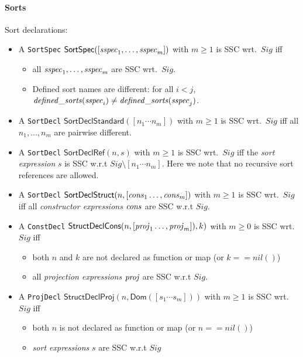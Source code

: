\documentclass[fleqn,a4paper,dvips]{article}
\newcommand{\aterm}[1]{\mathsf{#1}}
\begin{document}
\paragraph{Sorts}
Sort declarations:
\begin{itemize}
\item
  A {\tt SortSpec}
  $\aterm{SortSpec}([\nm{sspec}_1,\dots,\nm{sspec}_m])$ with $m\geq 1$
  is SSC wrt.\ $Sig$ iff
  \begin{itemize}
  \item all $\mathit{sspec}_1,\dots,\mathit{sspec}_m$ are SSC wrt.\ $Sig$.
  \item Defined sort names are different: for all $i<j$, $\mathit{defined\_sorts}(\mathit{sspec}_i)\neq\mathit{defined\_sorts}(\mathit{sspec}_j)$.
  \end{itemize}
\item
  A {\tt SortDecl}
  $\aterm{SortDeclStandard}([n_1\cdots n_m])$ with $m\geq 1$
  is SSC wrt.\ $Sig$ iff all $n_1,\ldots,n_m$ are pairwise
  different.
\item
  A {\tt SortDecl}
  $\aterm{SortDeclRef}(n,s)$ with $m\geq 1$
  is SSC wrt.\ $Sig$ iff the \emph{sort expression} $s$ is SSC w.r.t $Sig\setminus [n_1\cdots n_m]$.
  Here we note that no recursive sort references are allowed.
\item
  A {\tt SortDecl}
  $\aterm{SortDeclStruct}(n,[\nm{cons}_1\dots,\nm{cons}_m])$ with $m\geq 1$
  is SSC wrt.\ $Sig$ iff all \emph{constructor expressions} $\mathit{cons}$ are SSC w.r.t $Sig$.
\item
  A {\tt ConstDecl}
  $\aterm{StructDeclCons}(n,[\nm{proj}_1\dots,\nm{proj}_m]),k)$ with $m\geq 0$
  is SSC wrt.\ $Sig$ iff
  \begin{itemize}
  \item both $n$ and $k$ are not declared as function or map (or $k==nil()$)
  \item all \emph{projection expressions} $\mathit{proj}$ are SSC w.r.t $Sig$.
  \end{itemize}
\item
  A {\tt ProjDecl}
  $\aterm{StructDeclProj}(n,\aterm{Dom}([s_1\cdots s_m]))$ with $m\geq 1$
  is SSC wrt.\ $Sig$ iff
  \begin{itemize}
  \item both $n$ is not declared as function or map (or $n==nil()$)
  \item \emph{sort expressions} $s$ are SSC w.r.t $Sig$
  \end{itemize}
\end{itemize}
\end{document}
